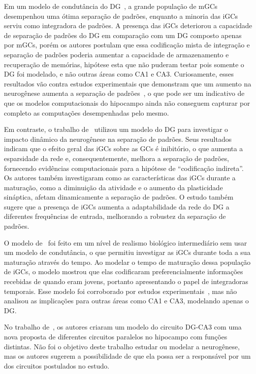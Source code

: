 Em um modelo de condutância do DG~\cite{kimEffect2024}, a grande população de mGCs desempenhou uma ótima separação de padrões,
enquanto a minoria das iGCs serviu como integradora de padrões. A presença das iGCs deteriorou a capacidade de separação de
padrões do DG em comparação com um DG composto apenas por mGCs, porém os autores postulam que essa codificação mista de integração
e separação de padrões poderia aumentar a capacidade de armazenamento e recuperação de memórias, hipótese esta que não puderam
testar pois somente o DG foi modelado, e não outras áreas como CA1 e CA3. Curiosamente, esses resultados vão contra estudos
experimentais que demonstram que um aumento na neurogênese aumenta a separação de padrões~\cite{sahayIncreasing2011}, o que pode
ser um indicativo de que os modelos computacionais do hipocampo ainda não conseguem capturar por completo as computações
desempenhadas pelo mesmo.

Em contraste, o trabalho de~ utilizou um modelo do DG para investigar o impacto dinâmico da
neurogênese na separação de padrões. Seus resultados indicam que o efeito geral das iGCs sobre as GCs é inibitório, o que aumenta
a esparsidade da rede e, consequentemente, melhora a separação de padrões, fornecendo evidências computacionais para a hipótese de
``codificação indireta''. Os autores também investigaram como as características das iGCs durante a maturação, como a diminuição
da atividade e o aumento da plasticidade sináptica, afetam dinamicamente a separação de padrões. O estudo também sugere que a
presença de iGCs aumenta a adaptabilidade da rede do DG a diferentes frequências de entrada, melhorando a robustez da separação de
padrões.

O modelo de~ foi feito em um nível de realismo biológico intermediário sem usar um modelo de
condutância, o que permitiu investigar as iGCs durante toda a sua maturação através do tempo. Ao modelar o tempo de maturação
dessa população de iGCs, o modelo mostrou que elas codificaram preferencialmente informações recebidas de quando eram jovens,
portanto apresentando o papel de integradoras temporais. Esse modelo foi corroborado por estudos
experimentais~\cite{berdugo-vegaSharpening2023}, mas não analisou as implicações para outras áreas como CA1 e CA3, modelando
apenas o DG.

No trabalho de~, os autores criaram um modelo do circuito DG-CA3 com uma nova proposta de
diferentes circuitos paralelos no hipocampo com funções distintas. Não foi o objetivo deste trabalho estudar ou modelar a
neurogênese, mas os autores sugerem a possibilidade de que ela possa ser a responsável por um dos circuitos postulados no estudo.

